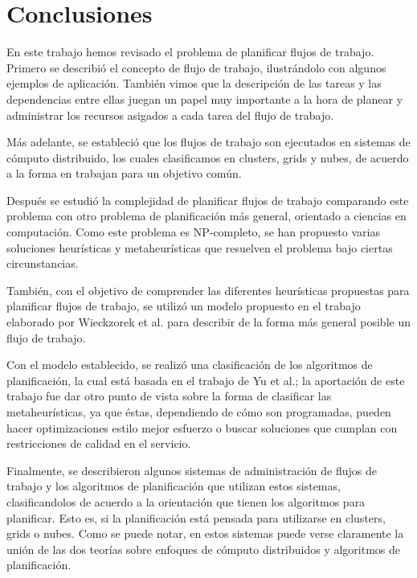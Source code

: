 \chapter{Conclusiones}


En este trabajo hemos revisado el problema de planificar flujos de trabajo. Primero se describió el concepto de flujo de trabajo, ilustrándolo con algunos ejemplos de aplicación. También vimos que la descripción de las tareas y las dependencias entre ellas juegan un papel muy importante a la hora de planear y administrar los recursos asigados a cada tarea del flujo de trabajo.

Más adelante, se estableció que los flujos de trabajo son ejecutados en sistemas de cómputo distribuido, los cuales clasificamos en clusters, grids y nubes, de acuerdo a la forma en trabajan para un objetivo común.

Después se estudió la complejidad de planificar flujos de trabajo comparando este problema con otro problema de planificación más general, orientado a ciencias en computación. Como este problema es NP-completo, se han propuesto varias soluciones heurísticas y metaheurísticas que resuelven el problema bajo ciertas circunstancias.

También, con el objetivo de comprender las diferentes heurísticas propuestas para planificar flujos de trabajo, se utilizó un modelo propuesto en el trabajo elaborado por Wieckzorek et al. para describir de la forma más general posible un flujo de trabajo.

Con el modelo establecido, se realizó una clasificación de los algoritmos de planificación, la cual está basada en el trabajo de Yu et al.; la aportación de este trabajo fue dar otro punto de vista sobre la forma de clasificar las metaheurísticas, ya que éstas, dependiendo de cómo son programadas, pueden hacer optimizaciones estilo mejor esfuerzo o buscar soluciones que cumplan con restricciones de calidad en el servicio.

Finalmente, se describieron algunos sistemas de administración de flujos de trabajo y los algoritmos de planificación que utilizan estos sistemas, clasificandolos de acuerdo a la orientación que tienen los algoritmos para planificar. Esto es, si la planificación está pensada para utilizarse en clusters, grids o nubes. Como se puede notar, en estos sistemas puede verse claramente la unión de las dos teorías sobre enfoques de cómputo distribuidos y algoritmos de planificación.

